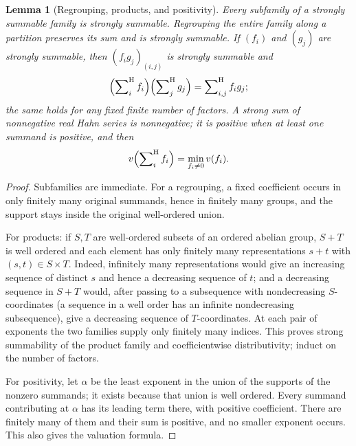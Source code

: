 \documentclass[11pt]{article}
\numberwithin{equation}{section}
\newtheorem{lemma}[theorem]{Lemma}
\theoremstyle{definition}
\theoremstyle{remark}
\newcommand{\hsum}{\mathop{\sum}\nolimits^{\mathrm H}}
\begin{document}
\begin{lemma}[Regrouping, products, and positivity]\label{meas:lem:sumalgebra}
Every subfamily of a strongly summable family is strongly summable.
Regrouping the entire family along a partition preserves its sum and is
strongly summable. If $(f_i)$ and $(g_j)$ are strongly summable,
then $(f_ig_j)_{(i,j)}$ is strongly summable and
\[
 \Bigl(\hsum_i f_i\Bigr)\Bigl(\hsum_jg_j\Bigr)=\hsum_{i,j}f_ig_j;
\]
the same holds for any fixed finite number of factors. A strong sum of
nonnegative real Hahn series is nonnegative; it is positive when at least one
summand is positive, and then
\[
 v\Bigl(\hsum_i f_i\Bigr)=\min_{f_i\ne0}v(f_i).
\]
\end{lemma}
\begin{proof}
Subfamilies are immediate. For a regrouping, a fixed coefficient occurs in
only finitely many original summands, hence in finitely many groups, and the
support stays inside the original well-ordered union.

For products: if $S,T$ are well-ordered subsets of an ordered abelian group,
$S+T$ is well ordered and each element has only finitely many representations
$s+t$ with $(s,t)\in S\times T$. Indeed, infinitely many representations would
give an increasing sequence of distinct $s$ and hence a decreasing sequence of
$t$; and a decreasing sequence in $S+T$ would, after passing to a subsequence
with nondecreasing $S$-coordinates (a sequence in a well order has an infinite
nondecreasing subsequence), give a decreasing sequence of $T$-coordinates. At
each pair of exponents the two families supply only finitely many indices.
This proves strong summability of the product family and coefficientwise
distributivity; induct on the number of factors.

For positivity, let $\alpha$ be the least exponent in the union of the supports
of the nonzero summands; it exists because that union is well ordered. Every
summand contributing at $\alpha$ has its leading term there, with positive
coefficient. There are finitely many of them and their sum is positive, and no
smaller exponent occurs. This also gives the valuation formula.
\end{proof}
\end{document}
